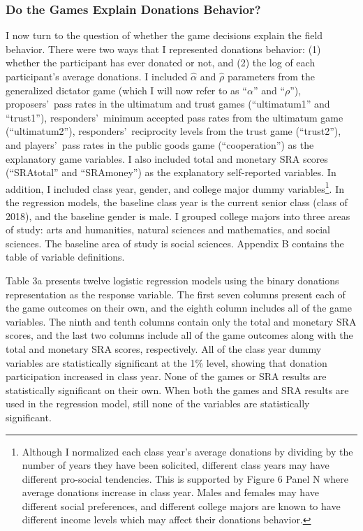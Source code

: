 \documentclass[12pt]{article}
\begin{document}
\subsubsection{Do the Games Explain Donations Behavior?}
I now turn to the question of whether the game decisions explain the field behavior. There were two ways that I represented donations behavior: (1) whether the participant has ever donated or not, and (2) the log of each participant\rq s average donations. I included \(\hat{\alpha}\) and \(\hat{\rho}\) parameters from the generalized dictator game (which I will now refer to as ``\(\alpha\)'' and ``\(\rho\)''), proposers\rq \ pass rates in the ultimatum and trust games (``ultimatum1'' and ``trust1''), responders\rq \ minimum accepted pass rates from the ultimatum game (``ultimatum2''), responders\rq \ reciprocity levels from the trust game (``trust2''), and players\rq \ pass rates in the public goods game (``cooperation'') as the explanatory game variables. I also included total and monetary SRA scores (``SRAtotal'' and ``SRAmoney'') as the explanatory self-reported variables. In addition, I included class year, gender, and college major dummy variables\footnote{Although I normalized each class year\rq s average donations by dividing by the number of years they have been solicited, different class years may have different pro-social tendencies. This is supported by Figure 6 Panel N where average donations increase in class year. Males and females may have different social preferences, and different college majors are known to have different income levels which may affect their donations behavior.}. In the regression models, the baseline class year is the current senior class (class of 2018), and the baseline gender is male. I grouped college majors into three areas of study: arts and humanities, natural sciences and mathematics, and social sciences. The baseline area of study is social sciences. Appendix B contains the table of variable definitions. 

Table 3a presents twelve logistic regression models using the binary donations representation as the response variable. The first seven columns present each of the game outcomes on their own, and the eighth column includes all of the game variables. The ninth and tenth columns contain only the total and monetary SRA scores, and the last two columns include all of the game outcomes along with the total and monetary SRA scores, respectively. All of the class year dummy variables are statistically significant at the 1\% level, showing that donation participation increased in class year. None of the games or SRA results are statistically significant on their own. When both the games and SRA results are used in the regression model, still none of the variables are statistically significant. 
\end{document}
